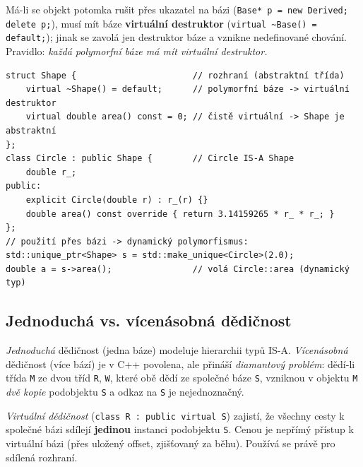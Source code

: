 \documentclass[11pt,a4paper]{article}
\newcommand{\cd}{\lstinline[style=cpp]}
\begin{document}
\begin{poznamka}
Má-li se objekt potomka rušit přes ukazatel na bázi (\cd{Base* p = new Derived; delete p;}), musí mít báze \textbf{virtuální destruktor} (\cd{virtual ~Base() = default;}); jinak se zavolá jen destruktor báze a vznikne nedefinované chování. Pravidlo: \emph{každá polymorfní báze má mít virtuální destruktor.}
\end{poznamka}

\begin{lstlisting}[style=cpp]
struct Shape {                       // rozhraní (abstraktní třída)
    virtual ~Shape() = default;      // polymorfní báze -> virtuální destruktor
    virtual double area() const = 0; // čistě virtuální -> Shape je abstraktní
};
class Circle : public Shape {        // Circle IS-A Shape
    double r_;
public:
    explicit Circle(double r) : r_(r) {}
    double area() const override { return 3.14159265 * r_ * r_; }
};
// použití přes bázi -> dynamický polymorfismus:
std::unique_ptr<Shape> s = std::make_unique<Circle>(2.0);
double a = s->area();                // volá Circle::area (dynamický typ)
\end{lstlisting}

\subsection{Jednoduchá vs. vícenásobná dědičnost}

\emph{Jednoduchá} dědičnost (jedna báze) modeluje hierarchii typů IS-A. \emph{Vícenásobná} dědičnost (více bází) je v C++ povolena, ale přináší \emph{diamantový problém}: dědí-li třída \texttt{M} ze dvou tříd \texttt{R}, \texttt{W}, které obě dědí ze společné báze \texttt{S}, vzniknou v objektu \texttt{M} \emph{dvě kopie} podobjektu \texttt{S} a odkaz na \texttt{S} je nejednoznačný.

\begin{definice}
\emph{Virtuální dědičnost} (\cd{class R : public virtual S}) zajistí, že všechny cesty k společné bázi sdílejí \textbf{jedinou} instanci podobjektu \texttt{S}. Cenou je nepřímý přístup k virtuální bázi (přes uložený offset, zjišťovaný za běhu). Používá se právě pro sdílená rozhraní.
\end{definice}
\end{document}
